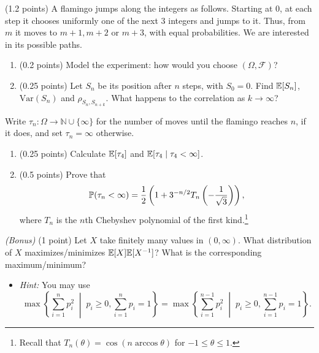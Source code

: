 \documentclass[a4paper]{report}
\begin{document}
\begin{problem} (1.2 points)
A flamingo jumps along the integers as follows. Starting at 0, at each step it chooses uniformly one of the next 3 integers and jumps to it. Thus, from $m$ it moves to $m+1,m+2$ or $m+3$, with equal probabilities. We are interested in its possible paths.
\begin{enumerate}
\item (0.2 points) Model the experiment: how would you choose $(\Omega,\mathcal F)$?
\item (0.25 points) Let $S_n$ be its position after $n$ steps, with $S_0=0$. Find $\E[S_n]$, $\mathrm{Var}(S_n)$ and $\rho_{S_n,S_{n+k}}$. What happens to the correlation as $k\to\infty$?
\end{enumerate}
Write $\tau_n:\Omega\to\mathbb N\cup\{\infty\}$ for the number of moves until the flamingo reaches $n$, if it does, and set $\tau_n=\infty$ otherwise.
\begin{enumerate}[start=3]
\item (0.25 points) Calculate $\E[\tau_4]$ and $\E[\tau_4\mid\tau_4<\infty]$.
\item (0.5 points) Prove that
\[\P(\tau_n<\infty)=\frac12\left(1+3^{-n/2}T_n\left(-\frac1{\sqrt3}\right)\right),\]
where $T_n$ is the $n$th Chebyshev polynomial of the first kind.\footnote{Recall that $T_n(\theta)=\cos(n\arccos\theta)$ for $-1\leq\theta\leq1$.}
\end{enumerate}
\end{problem}
\begin{problem} \emph{(Bonus)} (1 point)
Let $X$ take finitely many values in $(0,\infty)$. What distribution of $X$ maximizes/minimizes $\E[X]\E[X^{-1}]$? What is the corresponding maximum/minimum?
\begin{itemize}\item \emph{Hint:} You may use
\[\max\left\{\sum_{i=1}^np_i^2\;\middle|\;p_i\geq0,\sum_{i=1}^np_i=1\right\}=\max\left\{\sum_{i=1}^{n-1}p_i^2\;\middle|\;p_i\geq0,\sum_{i=1}^{n-1}p_i=1\right\}.\]
\end{itemize}
\end{problem}
\end{document}
